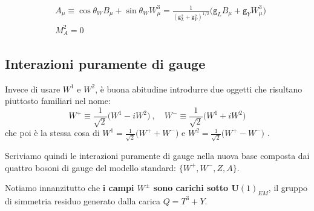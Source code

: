 \documentclass[../main.tex]{subfiles}
\begin{document}
\begin{equation}
    \boxed{\begin{aligned}
        &A_\mu \equiv \cos\theta_W B_\mu + \sin\theta_W W^3_\mu  = \frac{1}{(\mathsf g_L^2 +\mathsf g_Y^2)^{1/2}}\big(\mathsf g_L B_\mu + \mathsf g_Y W^3_\mu\big) \\
        &M_A^2 =0
    \end{aligned}}
    \label{eq:A_bosonfield}
\end{equation}

\subsection{Interazioni puramente di gauge}

Invece di usare $W^1$ e $W^2$, è buona abitudine introdurre due oggetti che risultano piuttosto familiari nel nome:
\begin{equation}
    \boxed{W^+ \equiv \frac{1}{\sqrt{2}}\big(W^1 - i W^2\big)~,\quad W^- \equiv \frac{1}{\sqrt{2}}\big(W^1 + i W^2\big)}
    \label{eq:W+-_def}
\end{equation}
che poi è la stessa cosa di $W^1 = \frac{1}{\sqrt{2}}\big(W^+ + W^-\big)$ e $W^2 = \frac{1}{\sqrt{2}}\big(W^+ - W^-\big)$ .

Scriviamo quindi le interazioni puramente di gauge nella nuova base composta dai quattro bosoni di gauge del modello standard: $\{W^+, W^-, Z, A\}$.

Notiamo innanzitutto che \textbf{i campi $W^\pm$ sono carichi sotto U$(1)_{EM}$}, il gruppo di simmetria residuo generato dalla carica $Q = T^3 + Y$.
\end{document}
